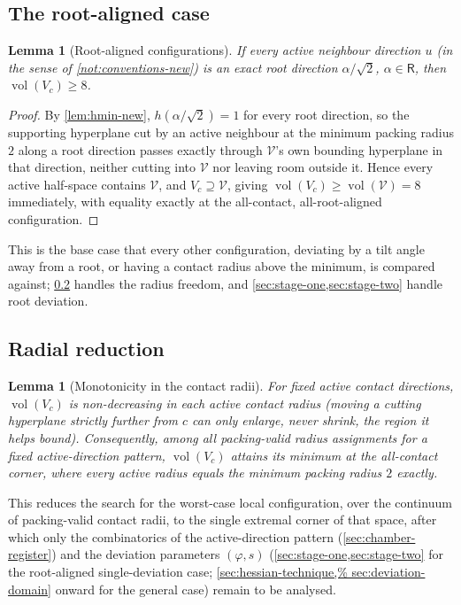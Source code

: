 \documentclass[11pt,reqno]{amsart}
\renewcommand{\_}{\origunderscore\allowbreak}
\numberwithin{equation}{section}
\theoremstyle{plain}
\newtheorem{lem}[thm]{Lemma}
\theoremstyle{definition}
\theoremstyle{remark}
\newcommand{\Rt}{\mathsf{R}}                 %
\newcommand{\VCell}{\mathcal{V}}             %
\newcommand{\tilt}{\varphi}                  %
\newcommand{\arcp}{s}                        %
\DeclareMathOperator{\vol}{vol}
\begin{document}
\subsection{The root-aligned case}\label{sec:root-aligned-new}

\begin{lem}[Root-aligned configurations]\label{lem:root-aligned-new}
If every active neighbour direction $u$ (in the sense of
\cref{not:conventions-new}) is an exact root direction
$\alpha/\sqrt2$, $\alpha\in\Rt$, then $\vol(V_c)\ge8$.
\end{lem}

\begin{proof}
By \cref{lem:hmin-new}, $h(\alpha/\sqrt2)=1$ for every root direction,
so the supporting hyperplane cut by an active neighbour at the minimum
packing radius $2$ along a root direction passes exactly through
$\VCell$'s own bounding hyperplane in that direction, neither cutting
into $\VCell$ nor leaving room outside it. Hence every active
half-space contains $\VCell$, and $V_c\supseteq\VCell$, giving
$\vol(V_c)\ge\vol(\VCell)=8$ immediately, with equality exactly at the
all-contact, all-root-aligned configuration.
\end{proof}

This is the base case that every other configuration, deviating by a
tilt angle away from a root, or having a contact radius above the
minimum, is compared against; \cref{sec:radial-new} handles the
radius freedom, and \cref{sec:stage-one,sec:stage-two} handle root
deviation.

\subsection{Radial reduction}\label{sec:radial-new}

\begin{lem}[Monotonicity in the contact radii]\label{lem:radial-new}
For fixed active contact directions, $\vol(V_c)$ is non-decreasing in
each active contact radius (moving a cutting hyperplane strictly
further from $c$ can only enlarge, never shrink, the region it helps
bound). Consequently, among all packing-valid radius assignments for a
fixed active-direction pattern, $\vol(V_c)$ attains its minimum at the
\emph{all-contact corner}, where every active radius equals the minimum
packing radius $2$ exactly.
\end{lem}

This reduces the search for the worst-case local configuration, over
the continuum of packing-valid contact radii, to the single extremal
corner of that space, after which only the combinatorics of the
active-direction pattern (\cref{sec:chamber-register}) and the
deviation parameters $(\tilt,\arcp)$ (\cref{sec:stage-one,sec:stage-two}
for the root-aligned single-deviation case; \cref{sec:hessian-technique,%
sec:deviation-domain} onward for the general case) remain to be
analysed.
\end{document}

